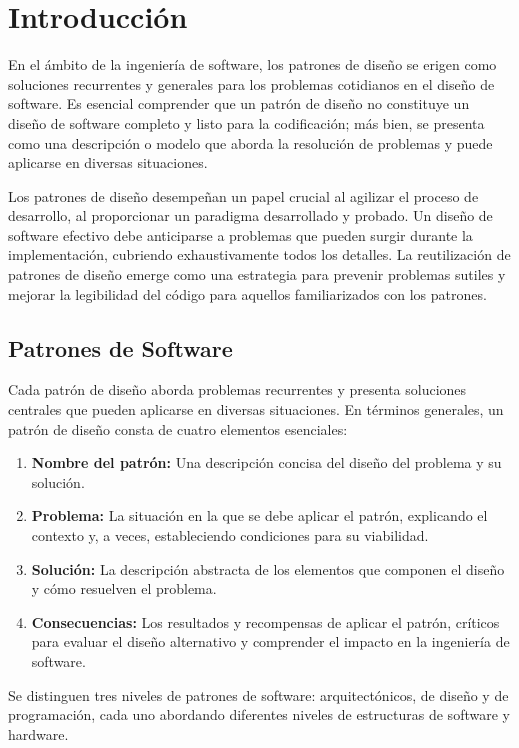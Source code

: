 \documentclass[11pt, twocolumn]{article}
\begin{document}
  \section*{Introducción}
  En el ámbito de la ingeniería de software, los patrones de diseño se erigen como soluciones recurrentes y generales para los problemas cotidianos en el diseño de software. Es esencial comprender que un patrón de diseño no constituye un diseño de software completo y listo para la codificación; más bien, se presenta como una descripción o modelo que aborda la resolución de problemas y puede aplicarse en diversas situaciones.

  Los patrones de diseño desempeñan un papel crucial al agilizar el proceso de desarrollo, al proporcionar un paradigma desarrollado y probado. Un diseño de software efectivo debe anticiparse a problemas que pueden surgir durante la implementación, cubriendo exhaustivamente todos los detalles. La reutilización de patrones de diseño emerge como una estrategia para prevenir problemas sutiles y mejorar la legibilidad del código para aquellos familiarizados con los patrones.

  \subsection*{Patrones de Software}
  Cada patrón de diseño aborda problemas recurrentes y presenta soluciones centrales que pueden aplicarse en diversas situaciones. En términos generales, un patrón de diseño consta de cuatro elementos esenciales:

  \begin{enumerate}
    \item \textbf{Nombre del patrón:} Una descripción concisa del diseño del problema y su solución.
    \item \textbf{Problema:} La situación en la que se debe aplicar el patrón, explicando el contexto y, a veces, estableciendo condiciones para su viabilidad.
    \item \textbf{Solución:} La descripción abstracta de los elementos que componen el diseño y cómo resuelven el problema.
    \item \textbf{Consecuencias:} Los resultados y recompensas de aplicar el patrón, críticos para evaluar el diseño alternativo y comprender el impacto en la ingeniería de software.
  \end{enumerate}
  
  Se distinguen tres niveles de patrones de software: arquitectónicos, de diseño y de programación, cada uno abordando diferentes niveles de estructuras de software y hardware.
\end{document}
